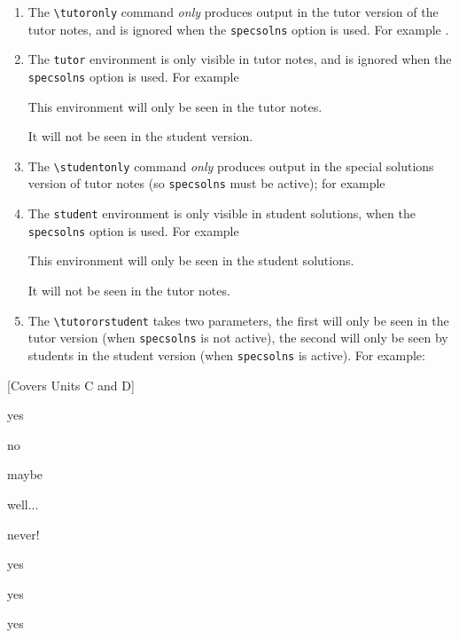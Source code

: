 \documentclass{outn}
\begin{document}
\begin{enumerate}
  \item The \verb|\tutoronly| command \emph{only} produces output in the tutor version of the tutor notes, 
    and is ignored when the \verb|specsolns| option is used. For example
    .
  \item The \verb|tutor| environment is only visible in tutor notes, 
    and is ignored when the \verb|specsolns| option is used. For example

    \begin{tutor}
      This environment will only be seen in the tutor notes.

      It will not be seen in the student version.
    \end{tutor}
    \tutoronly{\pagebreak}
  \item The \verb|\studentonly| command \emph{only} produces output in the 
    special solutions version of tutor notes (so \verb|specsolns| must be active); for example 
  \item The \verb|student| environment is only visible in student solutions, 
    \studentonly{\pagebreak}
    when the \verb|specsolns| option is used. For example

    \begin{student}
      This environment will only be seen in the student solutions.

      It will not be seen in the tutor notes.
    \end{student}
  \item The \verb|\tutororstudent| takes two parameters, the first will only be seen in the tutor version (when \verb|specsolns|
    is not active), the second will only be seen by students in the student version (when \verb|specsolns| is active).
    For example: 
\end{enumerate}

[Covers Units C and D]


\begin{inlineoptions}{5} %
\item yes
\item no
\item maybe
\item well...
\item never!
\item yes
\item yes
\item yes
\noitem %
\noitem
\end{inlineoptions}
\end{document}
